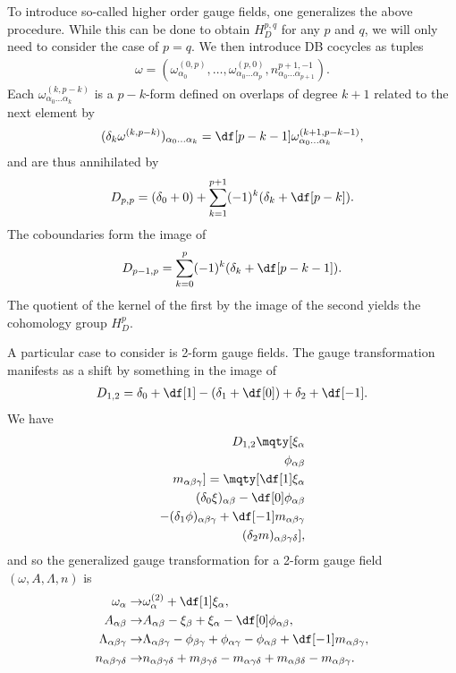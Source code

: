 To introduce so-called higher order gauge fields, one generalizes the above procedure. While this can be done to obtain $H_{D}^{p, q}$ for any $p$ and $q$, we will only need to consider the case of $p = q$. We then introduce DB cocycles as tuples
\begin{align*}
	\omega = \left(\omega_{\alpha_{0}}^{(0, p)}, \dots, \omega_{\alpha_{0}\dots\alpha_{p}}^{(p, 0)}, n_{\alpha_{0}\dots\alpha_{p + 1}}^{p + 1, -1}\right).
\end{align*}
Each $\omega_{\alpha_{0}\dots\alpha_{k}}^{(k, p - k)}$ is a $p - k$-form defined on overlaps of degree $k + 1$ related to the next element by
\begin{align*}
	(\delta_{k}\omega^{(k, p - k)})_{\alpha_{0}\dots\alpha_{k}} = \df[p - k - 1]\omega_{\alpha_{0}\dots\alpha_{k}}^{(k + 1, p - k - 1)},
\end{align*}
and are thus annihilated by
\begin{align*}
	D_{p, p} = (\delta_{0} + 0) + \sum\limits_{k = 1}^{p + 1}(-1)^{k}(\delta_{k} + \df[p - k]).
\end{align*}
The coboundaries form the image of
\begin{align*}
	D_{p - 1, p} = \sum\limits_{k = 0}^{p}(-1)^{k}(\delta_{k} + \df[p - k - 1]).
\end{align*}
The quotient of the kernel of the first by the image of the second yields the cohomology group $H_{D}^{p}$.

A particular case to consider is 2-form gauge fields. The gauge transformation manifests as a shift by something in the image of
\begin{align*}
	D_{1, 2} = \delta_{0} + \df[1] - (\delta_{1} + \df[0]) + \delta_{2} + \df[-1].
\end{align*}
We have
\begin{align*}
	D_{1, 2}\mqty[
		\xi_{\alpha} \\
		\phi_{\alpha\beta} \\
		m_{\alpha\beta\gamma}
	] = \mqty[
		\df[1]\xi_{\alpha} \\
		(\delta_{0}\xi)_{\alpha\beta} - \df[0]\phi_{\alpha\beta} \\
		-(\delta_{1}\phi)_{\alpha\beta\gamma} + \df[-1]m_{\alpha\beta\gamma} \\
		(\delta_{2}m)_{\alpha\beta\gamma\delta}
	],
\end{align*}
and so the generalized gauge transformation for a 2-form gauge field $(\omega, A, \Lambda, n)$ is
\begin{align*}
	\omega_{\alpha} \to& \omega_{\alpha}^{(2)} + \df[1]\xi_{\alpha}, \\
	A_{\alpha\beta} \to& A_{\alpha\beta} - \xi_{\beta} + \xi_{\alpha} - \df[0]\phi_{\alpha\beta}, \\
	\Lambda_{\alpha\beta\gamma} \to& \Lambda_{\alpha\beta\gamma} - \phi_{\beta\gamma} + \phi_{\alpha\gamma} - \phi_{\alpha\beta} + \df[-1]m_{\alpha\beta\gamma}, \\
	n_{\alpha\beta\gamma\delta} \to& n_{\alpha\beta\gamma\delta} + m_{\beta\gamma\delta} - m_{\alpha\gamma\delta} + m_{\alpha\beta\delta} - m_{\alpha\beta\gamma}.
\end{align*}


